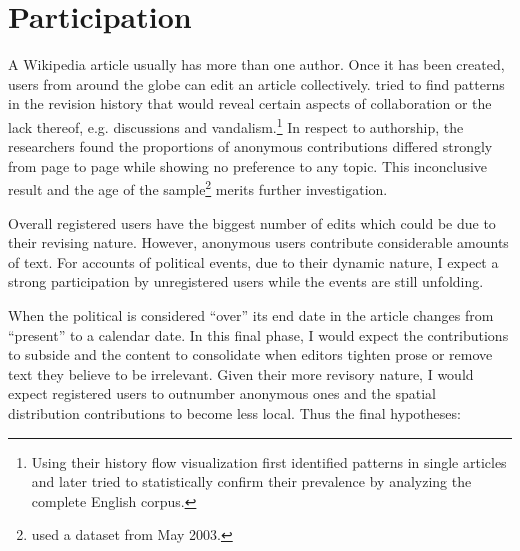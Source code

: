

\section{Participation}\label{sec:participation}

A Wikipedia article usually has more than one author.
Once it has been created, users from around the globe can edit an article collectively.
\textcite{viegas2004history} tried to find patterns in the revision history that would reveal certain aspects of collaboration or the lack thereof, e.g. discussions and vandalism.\footnote{Using their history flow visualization \textcite{viegas2004history} first identified patterns in single articles and later tried to statistically confirm their prevalence by analyzing the complete English corpus.} 
In respect to authorship, the researchers found the proportions of anonymous contributions differed strongly from page to page while showing no preference to any topic.
This inconclusive result and the age of the sample\footnote{\textcite{viegas2004history} used a dataset from May 2003.} merits further investigation. 

Overall registered users have the biggest number of edits which could be due to their revising nature.\cn
However, anonymous users contribute considerable amounts of text. 
For accounts of political events, due to their dynamic nature, I expect a strong participation by unregistered users while the events are still unfolding.



When the political is considered ``over'' its end date in the article changes from ``present'' to a calendar date.
In this final phase, I would expect the contributions to subside and the content to consolidate when editors tighten prose or remove text they believe to be irrelevant.
Given their more revisory nature\cn, I would expect registered users to outnumber anonymous ones and the spatial distribution contributions to become less local.
Thus the final hypotheses:




